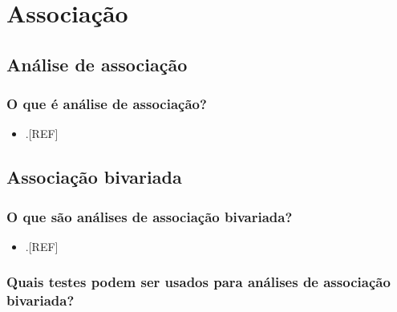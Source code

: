 \documentclass[
]{book}
\providecommand{\tightlist}{%
  \setlength{\itemsep}{0pt}\setlength{\parskip}{0pt}}
\begin{document}
\hypertarget{analise-inferencial-associacao}{%
\chapter{\texorpdfstring{\textbf{Associação}}{Associação}}\label{analise-inferencial-associacao}}

\hypertarget{analise-associacao}{%
\section{Análise de associação}\label{analise-associacao}}

\hypertarget{o-que-uxe9-anuxe1lise-de-associauxe7uxe3o}{%
\subsection{O que é análise de associação?}\label{o-que-uxe9-anuxe1lise-de-associauxe7uxe3o}}

\begin{itemize}
\tightlist
\item
  .{[}REF{]}
\end{itemize}

\hypertarget{bivariada}{%
\section{Associação bivariada}\label{bivariada}}

\hypertarget{o-que-suxe3o-anuxe1lises-de-associauxe7uxe3o-bivariada}{%
\subsection{O que são análises de associação bivariada?}\label{o-que-suxe3o-anuxe1lises-de-associauxe7uxe3o-bivariada}}

\begin{itemize}
\tightlist
\item
  .{[}REF{]}
\end{itemize}

\hypertarget{quais-testes-podem-ser-usados-para-anuxe1lises-de-associauxe7uxe3o-bivariada}{%
\subsection{Quais testes podem ser usados para análises de associação bivariada?}\label{quais-testes-podem-ser-usados-para-anuxe1lises-de-associauxe7uxe3o-bivariada}}
\end{document}
